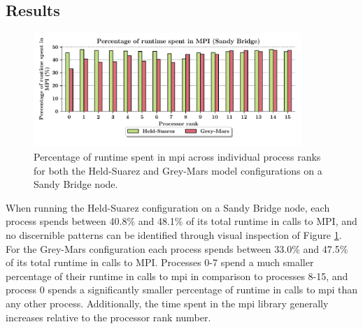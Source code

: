 \documentclass[a4paper,11pt]{report}
\begin{document}
\subsection{Results}
\begin{figure}[htbp]
\begin{center}
	\includegraphics[width=0.9\textwidth]{img/mpi-barrier-time.pdf}
\caption[Percentage of runtime spent in MPI across processes]{Percentage of runtime spent in \gls{mpi} across individual process ranks for both the Held-Suarez and Grey-Mars model configurations on a Sandy Bridge node.}
\label{fig:mpi-barrier}
\end{center}
\end{figure}
When running the Held-Suarez configuration on a Sandy Bridge node,  each process spends between 40.8\% and 48.1\% of its total runtime in calls to MPI, and no discernible patterns can be identified through visual inspection of Figure \ref{fig:mpi-barrier}. For the Grey-Mars configuration each process spends between 33.0\% and 47.5\% of its total runtime in calls to MPI. Processes 0-7 spend a much smaller percentage of their runtime in calls to \gls{mpi} in comparison to processes 8-15, and process 0 spends a significantly smaller percentage of runtime in calls to \gls{mpi} than any other process. Additionally, the time spent in the \gls{mpi} library generally increases relative to the processor rank number. 
\par
\end{document}
